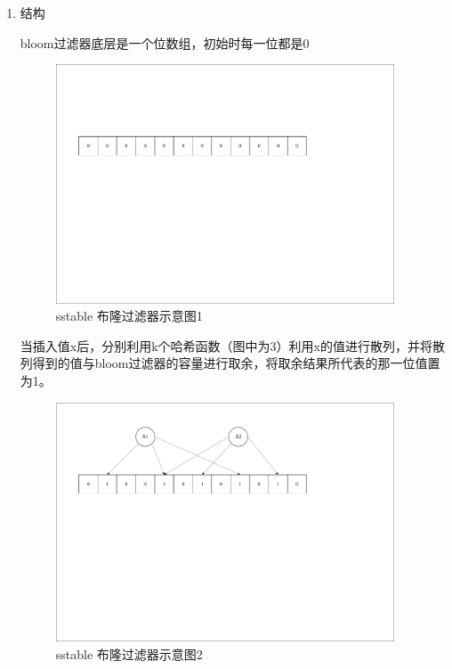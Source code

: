 		\begin{enumerate}
			\item 结构 
			
			bloom过滤器底层是一个位数组，初始时每一位都是0 

			\begin{figure}[H]
				\centering
				\includegraphics[width=0.95\textwidth]{pdf/bloom1.pdf}
				\caption{sstable 布隆过滤器示意图1}
				\label{sstable_bloom3}
			\end{figure}
			

当插入值x后，分别利用k个哈希函数（图中为3）利用x的值进行散列，并将散列得到的值与bloom过滤器的容量进行取余，将取余结果所代表的那一位值置为1。

\begin{figure}[H]
	\centering
	\includegraphics[width=0.95\textwidth]{pdf/bloom2.pdf}
	\caption{sstable 布隆过滤器示意图2}
	\label{sstable_bloom2}
\end{figure}


\end{enumerate}
